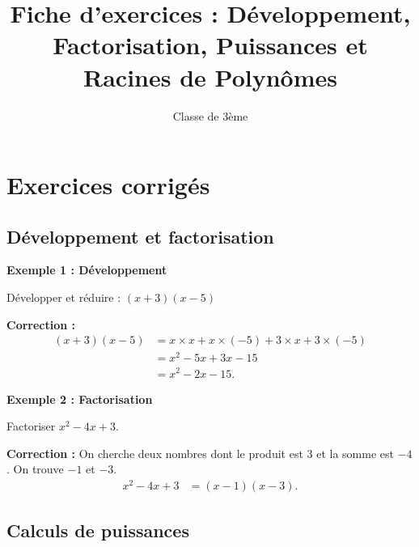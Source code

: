 \documentclass[a4paper,11pt]{article}
\begin{document}
\title{Fiche d'exercices : Développement, Factorisation, Puissances et Racines de Polynômes}
\author{Classe de 3ème}
\date{}
\maketitle

\section{Exercices corrigés}

\subsection{Développement et factorisation}

\textbf{Exemple 1 : Développement}

Développer et réduire : $(x+3)(x-5)$

\textbf{Correction :}
\begin{align*}
(x+3)(x-5) &= x \times x + x \times (-5) + 3 \times x + 3 \times (-5) \\
&= x^2 - 5x + 3x - 15 \\
&= x^2 - 2x - 15.
\end{align*}

\textbf{Exemple 2 : Factorisation}

Factoriser $x^2 - 4x + 3$.

\textbf{Correction :}
On cherche deux nombres dont le produit est $3$ et la somme est $-4$. On trouve $-1$ et $-3$.
\begin{align*}
x^2 - 4x + 3 &= (x - 1)(x - 3).
\end{align*}

\subsection{Calculs de puissances}

\textbf{Exemple 3 : Calcul de puissances}

Calculer $2^3 \times 2^4$.

\textbf{Correction :}
\begin{align*}
2^3 \times 2^4 &= 2^{3+4} = 2^7 = 128.
\end{align*}

\textbf{Exemple 4 : Puissances et fractions}

Calculer $\left(\frac{3}{2}\right)^2$.

\textbf{Correction :}
\begin{align*}
\left(\frac{3}{2}\right)^2 &= \frac{3^2}{2^2} = \frac{9}{4}.
\end{align*}
\end{document}
